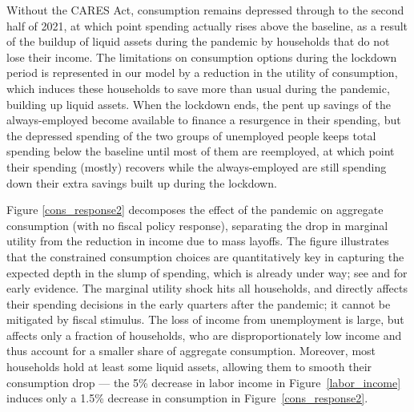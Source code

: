 Without the CARES Act, consumption remains depressed through to the second half of 2021, at which point spending actually rises above the baseline, as a result of the buildup of liquid assets during the pandemic by households that do not lose their income.
The limitations on consumption options during the lockdown period is represented in our model by a reduction in the utility of consumption, which induces these households to save more than usual during the pandemic, building up liquid assets.
 When the lockdown ends, the pent up savings of the always-employed become available to finance a resurgence in their spending, but the depressed spending of the two groups of unemployed people keeps total spending below the baseline until most of them are reemployed, at which point their spending (mostly) recovers while the always-employed are still spending down their extra savings built up during the lockdown.

Figure \ref{cons_response2} decomposes the effect of the pandemic on aggregate consumption (with no fiscal policy response), separating the drop in marginal utility from the reduction in income due to mass layoffs.
The figure illustrates that the constrained consumption choices are quantitatively key in capturing the expected depth in the slump of spending, which is already under way; see \cite{baker_Cpandemic} and \cite{nyFedCoronaBlog} for early evidence.
The marginal utility shock hits all households, and directly affects their spending decisions in the early quarters after the pandemic; it cannot be mitigated by fiscal stimulus.
The loss of income from unemployment is large, but affects only a fraction of households, who are disproportionately low income and thus account for a smaller share of aggregate consumption.
Moreover, most households hold at least some liquid assets, allowing them to smooth their consumption drop --- the 5\% decrease in labor income in Figure~\ref{labor_income} induces only a 1.5\% decrease in consumption in Figure~\ref{cons_response2}.

